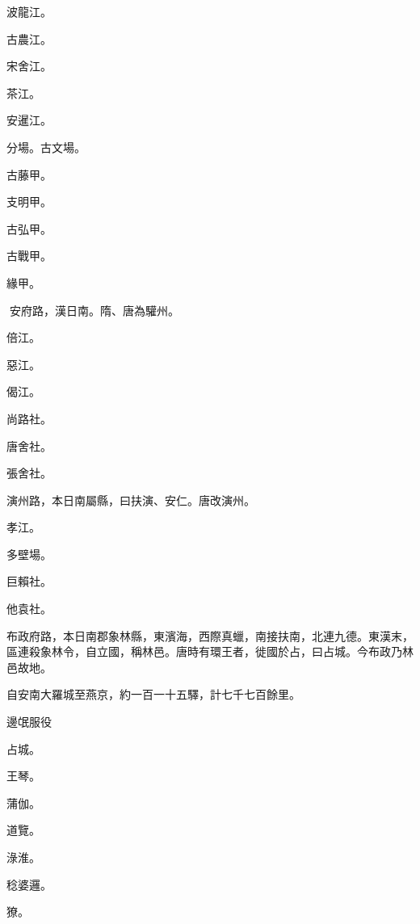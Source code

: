 \begin{pinyinscope}
 波龍江。



 古農江。



 宋舍江。



 茶江。



 安暹江。



 分場。古文場。



 古藤甲。



 支明甲。



 古弘甲。



 古戰甲。



 緣甲。



 安府路，漢日南。隋、唐為驩州。



 倍江。



 惡江。



 偈江。



 尚路社。



 唐舍社。



 張舍社。



 演州路，本日南屬縣，曰扶演、安仁。唐改演州。



 孝江。



 多壁場。



 巨賴社。



 他袁社。



 布政府路，本日南郡象林縣，東濱海，西際真蠟，南接扶南，北連九德。東漢末，區連殺象林令，自立國，稱林邑。唐時有環王者，徙國於占，曰占城。今布政乃林邑故地。



 自安南大羅城至燕京，約一百一十五驛，計七千七百餘里。



 邊氓服役



 占城。



 王琴。



 蒲伽。



 道覽。



 淥淮。



 稔婆邏。



 獠。



\end{pinyinscope}